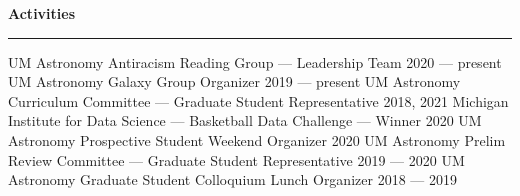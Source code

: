 \documentclass[10pt]{article}
\newcommand{\header}[1]{\vspace{2em}\par \textbf{\large #1}\strut\hrule\vspace{0em}}
\newcommand{\actionHeader}[2]{\textbf{#1 \hfill #2}}
\newcommand{\justifiedItemDate}[2]{\newline\null#1 \hfill #2}
\newcommand{\justifiedItemDateFirst}[2]{#1 \hfill #2}
\newcommand{\indentedItem}[1]{\newline\null\qquad #1}
\begin{document}





 \pagebreak

\header{Activities}
\justifiedItemDateFirst{UM Astronomy Antiracism Reading Group --- Leadership Team}{2020 --- present}
\justifiedItemDate{UM Astronomy Galaxy Group Organizer}{2019 --- present}
\justifiedItemDate{UM Astronomy Curriculum Committee --- Graduate Student Representative}{2018, 2021}
\justifiedItemDate{Michigan Institute for Data Science --- Basketball Data Challenge --- Winner}{2020}
\justifiedItemDate{UM Astronomy Prospective Student Weekend Organizer}{2020}
\justifiedItemDate{UM Astronomy Prelim Review Committee --- Graduate Student Representative}{2019 --- 2020}
\justifiedItemDate{UM Astronomy Graduate Student Colloquium Lunch Organizer}{2018 --- 2019}



\end{document}
